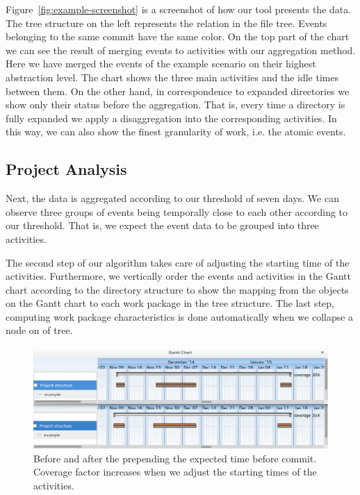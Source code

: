 Figure~\ref{fig:example-screenshot} is a screenshot of how our tool presents the data. The tree structure on the left represents the \parent relation in the file tree. Events belonging to the same commit have the same color. On the top part of the chart we can see the result of merging events to activities with our aggregation method. Here we have merged the events of the example scenario on their highest abstraction level. The chart shows the three main activities and the idle times between them. %
On the other hand, in correspondence to expanded directories we show only their status before the aggregation. That is, every time a directory is fully expanded we apply a disaggregation into the corresponding activities. In this way, we can also show the finest granularity of work, i.e. the atomic events.

\subsection{Project Analysis}
Next, the data is aggregated according to our threshold of seven days. We can observe three groups of events being temporally close to each other according to our threshold. That is, we expect the event data to be grouped into three activities.

The second step of our algorithm takes care of adjusting the starting time of the activities. Furthermore, we vertically order the events and activities in the Gantt chart according to the directory structure to show the mapping from the objects on the Gantt chart to each work package in the tree structure. The last step, computing work package characteristics is done automatically when we collapse a node on of tree.

\begin{figure}
\centering
\includegraphics[width=\textwidth]{bpm2015/imgs/coverage_before_and_after}
\caption{Before and after the prepending the expected time before commit. Coverage factor increases when we adjust the starting times of the activities.}
\label{fig:example-collapsed}
\end{figure}

